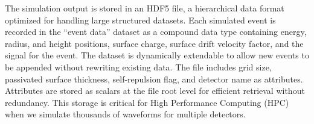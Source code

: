 The simulation output is stored in an HDF5 file, a hierarchical data format optimized for handling large structured datasets. Each simulated event is recorded in the ``event data'' dataset as a compound data type containing energy, radius, and height positions, surface charge, surface drift velocity factor, and the signal for the event. The dataset is dynamically extendable to allow new events to be appended without rewriting existing data. The file includes grid size, passivated surface thickness, self-repulsion flag, and detector name as attributes. Attributes are stored as scalars at the file root level for efficient retrieval without redundancy. This storage is critical for High Performance Computing (HPC) when we simulate thousands of waveforms for multiple detectors.


